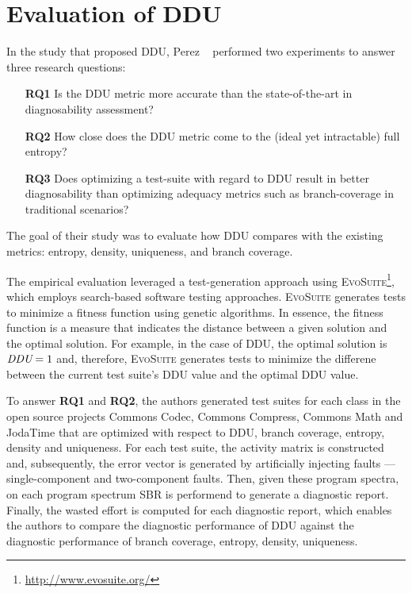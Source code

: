\documentclass[twoside,a4paper,11pt]{memoir}
\begin{document}
\section{Evaluation of DDU}
In the study that proposed DDU, Perez \etal~\cite{DBLP:conf/icse/PerezAD17} performed two experiments to answer three research questions:
\begin{enumerate}[noitemsep]
    \item [\textbf{RQ1}] Is the DDU metric more accurate than the state-of-the-art in diagnosability assessment?
    \item [\textbf{RQ2}] How close does the DDU metric come to the (ideal yet intractable) full entropy?
    \item [\textbf{RQ3}] Does optimizing a test-suite with regard to DDU result in better diagnosability than optimizing adequacy metrics such as branch-coverage in traditional scenarios?
\end{enumerate}
The goal of their study was to evaluate how DDU compares with the existing metrics: entropy, density, uniqueness, and branch coverage.

The empirical evaluation leveraged a test-generation approach using \textsc{EvoSuite}\footnote{\url{http://www.evosuite.org/}}, which employs search-based software testing approaches.
\textsc{EvoSuite} generates tests to minimize a fitness function using genetic algorithms.
In essence, the fitness function is a measure that indicates the distance between a given solution and the optimal solution.
For example, in the case of DDU, the optimal solution is \(\emph{DDU} = 1\) and, therefore, \textsc{EvoSuite} generates tests to minimize the differene between the current test suite's DDU value and the optimal DDU value.

To answer \textbf{RQ1} and \textbf{RQ2}, the authors generated test suites for each class in the open source projects Commons Codec, Commons Compress, Commons Math and JodaTime that are optimized with respect to DDU, branch coverage, entropy, density and uniqueness.
For each test suite, the activity matrix is constructed and, subsequently, the error vector is generated by artificially injecting faults --- single-component and two-component faults.
Then, given these program spectra, on each program spectrum SBR is performend to generate a diagnostic report.
Finally, the wasted effort is computed for each diagnostic report, which enables the authors to compare the diagnostic performance of DDU against the diagnostic performance of branch coverage, entropy, density, uniqueness.
\end{document}
